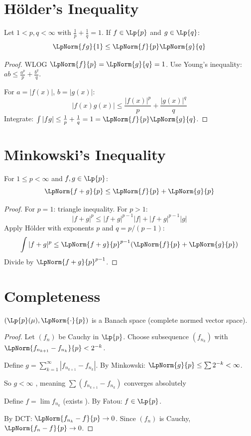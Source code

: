 \section{Hölder's Inequality}

\begin{theorem}[Hölder]
Let $1 < p, q < \infty$ with $\frac{1}{p} + \frac{1}{q} = 1$. If $f \in \Lp{p}$ and $g \in \Lp{q}$:
\[ \LpNorm{fg}{1} \leq \LpNorm{f}{p} \LpNorm{g}{q} \]
\end{theorem}

\begin{proof}
WLOG $\LpNorm{f}{p} = \LpNorm{g}{q} = 1$. Use Young's inequality: $ab \leq \frac{a^p}{p} + \frac{b^q}{q}$.

For $a = |f(x)|$, $b = |g(x)|$:
\[ |f(x)g(x)| \leq \frac{|f(x)|^p}{p} + \frac{|g(x)|^q}{q} \]
Integrate: $\int |fg| \leq \frac{1}{p} + \frac{1}{q} = 1 = \LpNorm{f}{p} \LpNorm{g}{q}$.
\end{proof}

\section{Minkowski's Inequality}

\begin{theorem}[Minkowski]
For $1 \leq p < \infty$ and $f, g \in \Lp{p}$:
\[ \LpNorm{f + g}{p} \leq \LpNorm{f}{p} + \LpNorm{g}{p} \]
\end{theorem}

\begin{proof}
For $p = 1$: triangle inequality. For $p > 1$:
\[ |f + g|^p \leq |f + g|^{p-1}|f| + |f + g|^{p-1}|g| \]
Apply Hölder with exponents $p$ and $q = p/(p-1)$:
\[ \int |f + g|^p \leq \LpNorm{f + g}{p}^{p-1}(\LpNorm{f}{p} + \LpNorm{g}{p}) \]
Divide by $\LpNorm{f + g}{p}^{p-1}$.
\end{proof}

\section{Completeness}

\begin{theorem}
$(\Lp{p}(\mu), \LpNorm{\cdot}{p})$ is a Banach space (complete normed vector space).
\end{theorem}

\begin{proof}
Let $(f_n)$ be Cauchy in $\Lp{p}$. Choose subsequence $(f_{n_k})$ with $\LpNorm{f_{n_{k+1}} - f_{n_k}}{p} < 2^{-k}$.

Define $g = \sum_{k=1}^\infty |f_{n_{k+1}} - f_{n_k}|$. By Minkowski: $\LpNorm{g}{p} \leq \sum 2^{-k} < \infty$.

So $g < \infty$ \almosteverywhere{}, meaning $\sum (f_{n_{k+1}} - f_{n_k})$ converges absolutely \almosteverywhere{}

Define $f = \lim f_{n_k}$ (exists \almosteverywhere{}). By Fatou: $f \in \Lp{p}$.

By DCT: $\LpNorm{f_{n_k} - f}{p} \to 0$. Since $(f_n)$ is Cauchy, $\LpNorm{f_n - f}{p} \to 0$.
\end{proof}


